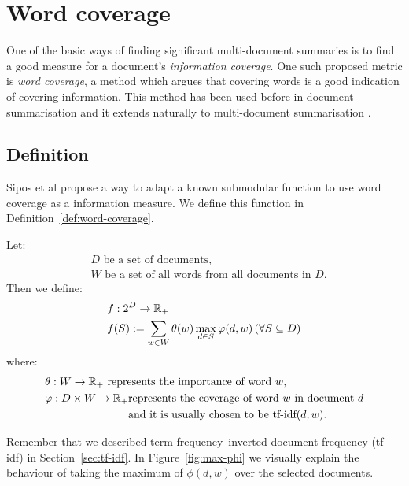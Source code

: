 \section{Word coverage}
\label{sec:word-coverage}

One of the basic ways of finding significant multi-document summaries is to
find a good measure for a document's \emph{information coverage}. One such
proposed metric is \emph{word coverage}, a method which argues that covering
words is a good indication of covering information. This method has been used
before in document summarisation and it extends naturally to multi-document
summarisation \cite{sipos2012temporal}.

\subsection{Definition}

Sipos et al \cite{sipos2012temporal} propose a way to adapt a known submodular
function to use word coverage as a information measure. We define this function
in Definition~\ref{def:word-coverage}.
\begin{definition}
  \label{def:word-coverage}
  Let:
  \begin{align*}
    &D \text{ be a set of documents, } \\
    &W \text{ be a set of all words from all documents in \(D\).}
  \end{align*}
  Then we define:
  \begin{align*}
    &f : 2^D \to \mathbb{R}_+ \\
    &f(S) := \sum_{w \in W} \theta(w) \max_{d \in S} \varphi(d, w)
    \,(\forall S \subseteq D)
  \end{align*}
  where:
  \begin{align*}
    &\theta : W \to \mathbb{R}_+ \text{ represents the importance of word \(w\),} \\
    &\varphi : D \times W \to \mathbb{R}_+
    \begin{aligned}[t]
      &\text{represents the coverage of word \(w\) in document \(d\)} \\
      &\text{and it is usually chosen to be tf-idf\((d, w)\).}
    \end{aligned}
  \end{align*}
\end{definition}
Remember that we described term-frequency--inverted-document-frequency (tf-idf)
in Section~\vref{sec:tf-idf}. In Figure~\ref{fig:max-phi} we visually explain
the behaviour of taking the maximum of \(\phi(d, w)\) over the selected
documents.

